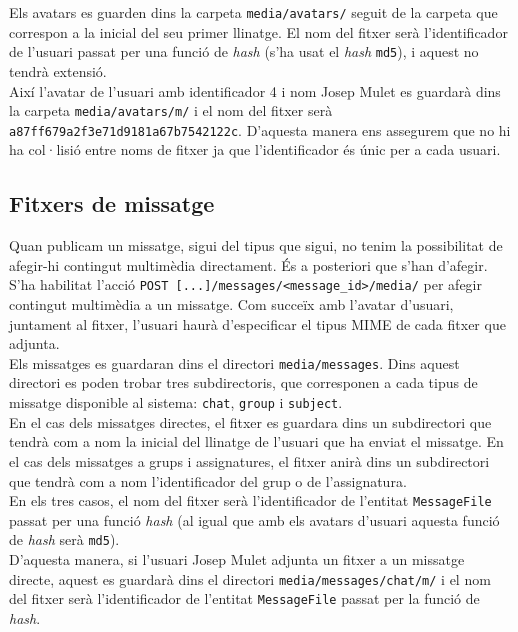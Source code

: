 Els avatars es guarden dins la carpeta \texttt{media/avatars/} seguit de la carpeta que correspon a la inicial del seu primer llinatge. El nom del fitxer serà l'identificador de l'usuari passat per una funció de \emph{hash} (s'ha usat el \emph{hash} \texttt{md5}), i aquest no tendrà extensió. \\

Així l'avatar de l'usuari amb identificador 4 i nom Josep Mulet es guardarà dins la carpeta \texttt{media/avatars/m/} i el nom del fitxer serà \texttt{a87ff679a2f3e71d9181a67b7542122c}. D'aquesta manera ens assegurem que no hi ha col·lisió entre noms de fitxer ja que l'identificador és únic per a cada usuari.

\subsection{Fitxers de missatge}

Quan publicam un missatge, sigui del tipus que sigui, no tenim la possibilitat de afegir-hi contingut multimèdia directament. És a posteriori que s'han d'afegir. S'ha habilitat l'acció \verb$POST [...]/messages/<message_id>/media/$ per afegir contingut multimèdia a un missatge. Com succeïx amb l'avatar d'usuari, juntament al fitxer, l'usuari haurà d'especificar el tipus \ac{MIME} de cada fitxer que adjunta.\\

Els missatges es guardaran dins el directori \texttt{media/messages}. Dins aquest directori es poden trobar tres subdirectoris, que corresponen a cada tipus de missatge disponible al sistema: \texttt{chat}, \texttt{group} i \texttt{subject}.\\

En el cas dels missatges directes, el fitxer es guardara dins un subdirectori que tendrà com a nom la inicial del llinatge de l'usuari que ha enviat el missatge. En el cas dels missatges a grups i assignatures, el fitxer anirà dins un subdirectori que tendrà com a nom l'identificador del grup o de l'assignatura. \\

En els tres casos, el nom del fitxer serà l'identificador de l'entitat \texttt{MessageFile} passat per una funció \emph{hash} (al igual que amb els avatars d'usuari aquesta funció de \emph{hash} serà \texttt{md5}).\\

D'aquesta manera, si l'usuari Josep Mulet adjunta un fitxer a un missatge directe, aquest es guardarà dins el directori \texttt{media/messages/chat/m/} i el nom del fitxer serà l'identificador de l'entitat \texttt{MessageFile} passat per la funció de \emph{hash}.

